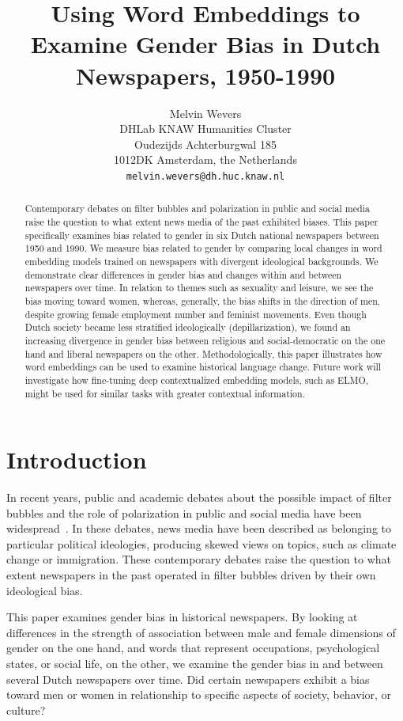\documentclass[11pt,a4paper]{article}
\title{Using Word Embeddings to Examine Gender Bias in Dutch Newspapers, 1950-1990}
\author{Melvin Wevers \\
  DHLab KNAW Humanities Cluster\\
  Oudezijds Achterburgwal 185 \\
  1012DK Amsterdam, the Netherlands \\
  \texttt{melvin.wevers@dh.huc.knaw.nl}}
\date{}
\begin{document}
\maketitle
\begin{abstract}
Contemporary debates on filter bubbles and polarization in public and social media raise the question to what extent news media of the past exhibited biases. This paper specifically examines bias related to gender in six Dutch national newspapers between 1950 and 1990. We measure bias related to gender by comparing local changes in word embedding models trained on newspapers with divergent ideological backgrounds.
We demonstrate clear differences in gender bias and changes within and between newspapers over time. In relation to themes such as sexuality and leisure, we see the bias moving toward women, whereas, generally, the bias shifts in the direction of men, despite growing female employment number and feminist movements. Even though Dutch society became less stratified ideologically (depillarization), we found an increasing divergence in gender bias between religious and social-democratic on the one hand and liberal newspapers on the other.
Methodologically, this paper illustrates how word embeddings can be used to examine historical language change. Future work will investigate how fine-tuning deep contextualized embedding models, such as ELMO, might be used for similar tasks with greater contextual information.
\end{abstract}

\section{Introduction}
In recent years, public and academic debates about the possible impact of filter bubbles and the role of polarization in public and social media have been widespread~\cite{pariser2011filter, flaxman2016filter}. In these debates, news media have been described as belonging to particular political ideologies, producing skewed views on topics, such as climate change or immigration. These contemporary debates raise the question to what extent newspapers in the past operated in filter bubbles driven by their own ideological bias.

This paper examines gender bias in historical newspapers. By looking at differences in the strength of association between male and female dimensions of gender on the one hand, and words that represent occupations, psychological states, or social life, on the other, we examine the gender bias in and between several Dutch newspapers over time. Did certain newspapers exhibit a bias toward men or women in relationship to specific aspects of society, behavior, or culture?
\end{document}
